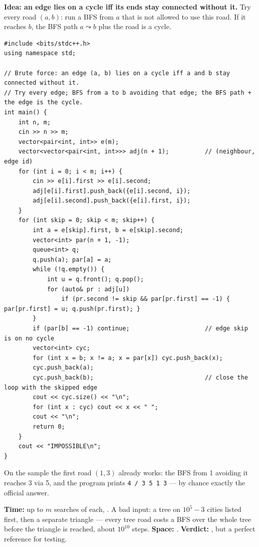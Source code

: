 \begin{bruteforcebox}
\textbf{Idea: an edge lies on a cycle iff its ends stay connected without it.} Try every road $(a,b)$: run a BFS from $a$ that is not allowed to use this road. If it reaches $b$, the BFS path $a \leadsto b$ plus the road is a cycle.

\begin{lstlisting}[style=cpp]
#include <bits/stdc++.h>
using namespace std;

// Brute force: an edge (a, b) lies on a cycle iff a and b stay connected without it.
// Try every edge; BFS from a to b avoiding that edge; the BFS path + the edge is the cycle.
int main() {
    int n, m;
    cin >> n >> m;
    vector<pair<int, int>> e(m);
    vector<vector<pair<int, int>>> adj(n + 1);          // (neighbour, edge id)
    for (int i = 0; i < m; i++) {
        cin >> e[i].first >> e[i].second;
        adj[e[i].first].push_back({e[i].second, i});
        adj[e[i].second].push_back({e[i].first, i});
    }
    for (int skip = 0; skip < m; skip++) {
        int a = e[skip].first, b = e[skip].second;
        vector<int> par(n + 1, -1);
        queue<int> q;
        q.push(a); par[a] = a;
        while (!q.empty()) {
            int u = q.front(); q.pop();
            for (auto& pr : adj[u])
                if (pr.second != skip && par[pr.first] == -1) { par[pr.first] = u; q.push(pr.first); }
        }
        if (par[b] == -1) continue;                     // edge skip is on no cycle
        vector<int> cyc;
        for (int x = b; x != a; x = par[x]) cyc.push_back(x);
        cyc.push_back(a);
        cyc.push_back(b);                               // close the loop with the skipped edge
        cout << cyc.size() << "\n";
        for (int x : cyc) cout << x << " ";
        cout << "\n";
        return 0;
    }
    cout << "IMPOSSIBLE\n";
}
\end{lstlisting}

On the sample the first road $(1,3)$ already works: the BFS from 1 avoiding it reaches 3 via 5, and the program prints \texttt{4 / 3 5 1 3} --- by chance exactly the official answer.

\begin{complexitybox}
\textbf{Time:} up to $m$ searches of  each, . A bad input: a tree on $10^5 - 3$ cities listed first, then a separate triangle --- every tree road costs a BFS over the whole tree before the triangle is reached, about $10^{10}$ steps. \textbf{Space:} . \textbf{Verdict:} \tle{}, but a perfect reference for testing.
\end{complexitybox}
\end{bruteforcebox}

